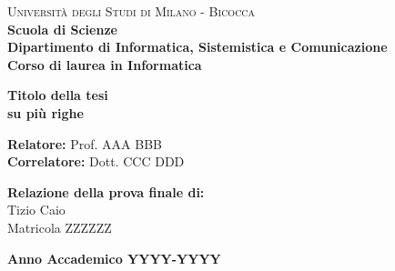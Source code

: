 \begin{titlepage}
        
    \noindent
    \begin{minipage}[t]{0.19\textwidth}
    \end{minipage}
    \begin{minipage}[t]{0.81\textwidth}
    {
            {\textsc{Università degli Studi di Milano - Bicocca}} \\
            \textbf{Scuola di Scienze} \\
            \textbf{Dipartimento di Informatica, Sistemistica e Comunicazione} \\
            \textbf{Corso di laurea in Informatica} \\
            \par
    }
    \end{minipage}
    
\vspace{40mm}
    
\begin{center}
        {\LARGE{
                \textbf{Titolo della tesi \\ su più righe}
                \par
        }}
    \end{center}
    
    \vspace{50mm}

    \noindent
    {\large \textbf{Relatore:} Prof. AAA BBB } \\

    \noindent
    {\large \textbf{Correlatore:} Dott. CCC DDD}
        
    \vspace{15mm}

    \begin{flushright}
        {\large \textbf{Relazione della prova finale di:}} \\
        \large{Tizio Caio} \\
        \large{Matricola ZZZZZZ} 
    \end{flushright}
        
    \vspace{40mm}
    \begin{center}
        {\large{\bf Anno Accademico YYYY-YYYY}}
    \end{center}

    \restoregeometry
        
\end{titlepage}
